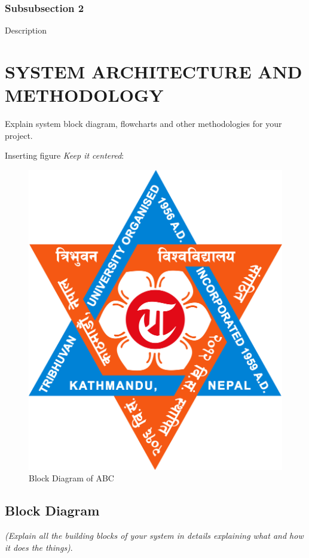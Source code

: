 \documentclass{ioereport}
\begin{document}
        \subsubsection{Subsubsection 2}
        Description

    \pagebreak
    
\section{\MakeUppercase{System Architecture and Methodology}}
    Explain system block diagram, flowcharts and other methodologies for your project.
    
    Inserting figure \textit{Keep it centered}:\\
    \begin{figure}[H]
        \centering
        \includegraphics[scale=0.1]{TU_Logo.jpg}
        \caption{Block Diagram of ABC}
        \label{fig:logotu}
    \end{figure}

    \subsection{Block Diagram}
    \textit{(Explain all the building blocks of your system in details explaining what and how it does the things)}.
\end{document}
